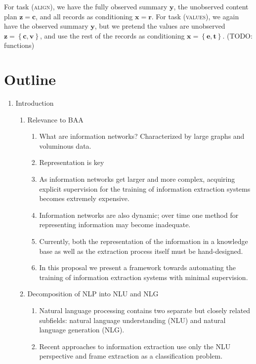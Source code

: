 \documentclass[11pt]{article}
\newcommand\set[1]{\left\{#1\right\}}
\newcommand{\bc}{\mathbf{c}}
\newcommand{\be}{\mathbf{e}}
\newcommand{\br}{\mathbf{r}}
\newcommand{\bt}{\mathbf{t}}
\newcommand{\bv}{\mathbf{v}}
\newcommand{\bx}{\mathbf{x}}
\newcommand{\by}{\mathbf{y}}
\newcommand{\bz}{\mathbf{z}}
\begin{document}
For task (\textsc{align}), we have the fully observed summary $\by$,
the unobserved content plan $\bz=\bc$, and all records as conditioning $\bx=\br$.
For task (\textsc{values}), we again have the observed summary $\by$,
but we pretend the values are unobserved $\bz=\set{\bc,\bv}$, and
use the rest of the records as conditioning $\bx=\set{\be,\bt}$.
(TODO: functions)

\newpage

\section*{Outline}
\begin{enumerate}
\item Introduction
    \begin{enumerate}
    \item Relevance to BAA
        \begin{enumerate}
        \item What are information networks? Characterized by large graphs and voluminous data.
        \item Representation is key
        \item As information networks get larger and more complex,
            acquiring explicit supervision for the training of information extraction systems
            becomes extremely expensive.
        \item Information networks are also dynamic;
            over time one method for representing information may become inadequate.
        \item Currently, both the representation of the information in a knowledge base
            as well as the extraction process itself must be hand-designed.
        \item In this proposal we present a framework towards automating the
            training of information extraction systems with minimal supervision.
        \end{enumerate}
    \item Decomposition of NLP into NLU and NLG
        \begin{enumerate}
        \item Natural language processing contains two separate but
            closely related subfields: natural language understanding (NLU) and natural language
            generation (NLG).
        \item Recent approaches to information extraction use only the NLU perspective
            and frame extraction as a classification problem.

\end{enumerate}
\end{enumerate}
\end{enumerate}
\end{document}
